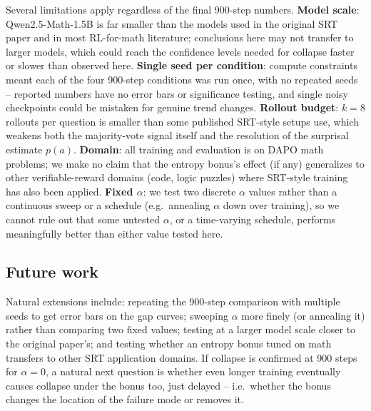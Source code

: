 \documentclass{article}
\begin{document}
Several limitations apply regardless of the final 900-step numbers.
\textbf{Model scale}: Qwen2.5-Math-1.5B is far smaller than the models used
in the original SRT paper and in most RL-for-math literature; conclusions
here may not transfer to larger models, which could reach the confidence
levels needed for collapse faster or slower than observed here.
\textbf{Single seed per condition}: compute constraints meant each of the
four 900-step conditions was run once, with no repeated seeds -- reported
numbers have no error bars or significance testing, and single noisy
checkpoints could be mistaken for genuine trend changes.
\textbf{Rollout budget}: $k{=}8$ rollouts per question is smaller than some
published SRT-style setups use, which weakens both the majority-vote signal
itself and the resolution of the surprisal estimate $p(a)$.
\textbf{Domain}: all training and evaluation is on DAPO math problems; we
make no claim that the entropy bonus's effect (if any) generalizes to other
verifiable-reward domains (code, logic puzzles) where SRT-style training has
also been applied.
\textbf{Fixed $\alpha$}: we test two discrete $\alpha$ values rather than a
continuous sweep or a schedule (e.g.\ annealing $\alpha$ down over training),
so we cannot rule out that some untested $\alpha$, or a time-varying
schedule, performs meaningfully better than either value tested here.

\subsection{Future work}

Natural extensions include: repeating the 900-step comparison with multiple
seeds to get error bars on the gap curves; sweeping $\alpha$ more finely (or
annealing it) rather than comparing two fixed values; testing at a larger
model scale closer to the original paper's; and testing whether an entropy
bonus tuned on math transfers to other SRT application domains. If collapse
is confirmed at 900 steps for $\alpha{=}0$, a natural next question is
whether even longer training eventually causes collapse under the bonus too,
just delayed -- i.e.\ whether the bonus changes the location of the failure
mode or removes it.
\end{document}

